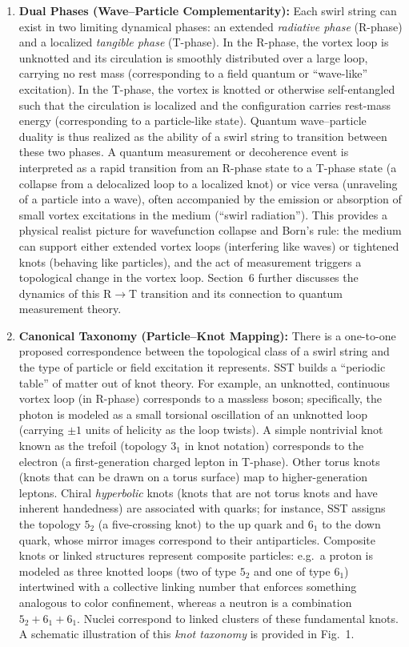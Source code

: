 \documentclass[10pt,reprint,aps,onecolumn,nofootinbib]{revtex4-2}
\begin{document}
\begin{enumerate}
    \item \textbf{Dual Phases (Wave–Particle Complementarity):} Each swirl string can exist in two limiting dynamical phases: an extended \emph{radiative phase} (R-phase) and a localized \emph{tangible phase} (T-phase). In the R-phase, the vortex loop is unknotted and its circulation is smoothly distributed over a large loop, carrying no rest mass (corresponding to a field quantum or ``wave-like'' excitation). In the T-phase, the vortex is knotted or otherwise self-entangled such that the circulation is localized and the configuration carries rest-mass energy (corresponding to a particle-like state). Quantum wave–particle duality is thus realized as the ability of a swirl string to transition between these two phases. A quantum measurement or decoherence event is interpreted as a rapid transition from an R-phase state to a T-phase state (a collapse from a delocalized loop to a localized knot) or vice versa (unraveling of a particle into a wave), often accompanied by the emission or absorption of small vortex excitations in the medium (``swirl radiation''). This provides a physical realist picture for wavefunction collapse and Born’s rule: the medium can support either extended vortex loops (interfering like waves) or tightened knots (behaving like particles), and the act of measurement triggers a topological change in the vortex loop. Section~6 further discusses the dynamics of this R$\to$T transition and its connection to quantum measurement theory.

    \item \textbf{Canonical Taxonomy (Particle–Knot Mapping):} There is a one-to-one proposed correspondence between the topological class of a swirl string and the type of particle or field excitation it represents. SST builds a ``periodic table'' of matter out of knot theory. For example, an unknotted, continuous vortex loop (in R-phase) corresponds to a massless boson; specifically, the photon is modeled as a small torsional oscillation of an unknotted loop (carrying $\pm 1$ units of helicity as the loop twists). A simple nontrivial knot known as the trefoil (topology $3_1$ in knot notation) corresponds to the electron (a first-generation charged lepton in T-phase). Other torus knots (knots that can be drawn on a torus surface) map to higher-generation leptons. Chiral \emph{hyperbolic} knots (knots that are not torus knots and have inherent handedness) are associated with quarks; for instance, SST assigns the topology $5_2$ (a five-crossing knot) to the up quark and $6_1$ to the down quark, whose mirror images correspond to their antiparticles. Composite knots or linked structures represent composite particles: e.g.\ a proton is modeled as three knotted loops (two of type $5_2$ and one of type $6_1$) intertwined with a collective linking number that enforces something analogous to color confinement, whereas a neutron is a combination $5_2+6_1+6_1$. Nuclei correspond to linked clusters of these fundamental knots. A schematic illustration of this \emph{knot taxonomy} is provided in Fig.~1.
\end{enumerate}
\end{document}
